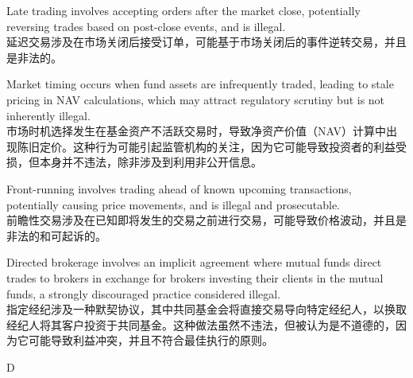 \documentclass{article}
\begin{document}
\begin{choices}
    \item Late trading involves accepting orders after the market close, potentially reversing trades based on post-close events, and is illegal.\\
    延迟交易涉及在市场关闭后接受订单，可能基于市场关闭后的事件逆转交易，并且是非法的。
    \item Market timing occurs when fund assets are infrequently traded, leading to stale pricing in NAV calculations, which may attract regulatory scrutiny but is not inherently illegal.\\
    市场时机选择发生在基金资产不活跃交易时，导致净资产价值（NAV）计算中出现陈旧定价。这种行为可能引起监管机构的关注，因为它可能导致投资者的利益受损，但本身并不违法，除非涉及到利用非公开信息。
    \item Front-running involves trading ahead of known upcoming transactions, potentially causing price movements, and is illegal and prosecutable.\\
    前瞻性交易涉及在已知即将发生的交易之前进行交易，可能导致价格波动，并且是非法的和可起诉的。
    \item Directed brokerage involves an implicit agreement where mutual funds direct trades to brokers in exchange for brokers investing their clients in the mutual funds, a strongly discouraged practice considered illegal.\\
    指定经纪涉及一种默契协议，其中共同基金会将直接交易导向特定经纪人，以换取经纪人将其客户投资于共同基金。这种做法虽然不违法，但被认为是不道德的，因为它可能导致利益冲突，并且不符合最佳执行的原则。
\end{choices}

\begin{correctanswer}
    D
\end{correctanswer}
\end{document}
